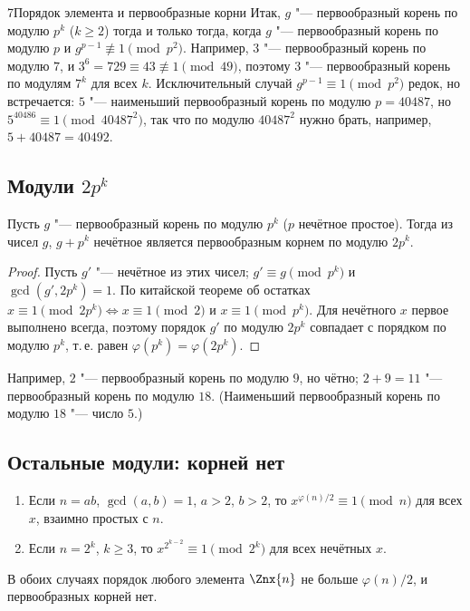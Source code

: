 \begin{lecture}{7}{Порядок элемента и первообразные корни}
Итак, $g$ "--- первообразный корень по модулю $p^k$ ($k \ge 2$) тогда и только тогда, когда
$g$ "--- первообразный корень по модулю $p$ и $g^{p-1} \not\equiv 1 \pmod{p^2}$. Например,
$3$ "--- первообразный корень по модулю $7$, и $3^6 = 729 \equiv 43 \not\equiv 1 \pmod{49}$,
поэтому $3$ "--- первообразный корень по модулям $7^k$ для всех $k$. Исключительный случай
$g^{p-1} \equiv 1 \pmod{p^2}$ редок, но встречается: $5$ "--- наименьший первообразный корень
по модулю $p = 40487$, но $5^{40486} \equiv 1 \pmod{40487^2}$, так что по модулю $40487^2$
нужно брать, например, $5 + 40487 = 40492$.

\subsection{Модули \texorpdfstring{$2p^k$}{2p\^{}k}}

\begin{proposition}\label{l7:2pk}
Пусть $g$ "--- первообразный корень по модулю $p^k$ ($p$ нечётное простое). Тогда из чисел
$g$, $g + p^k$ нечётное является первообразным корнем по модулю $2p^k$.
\end{proposition}

\begin{proof}
Пусть $g'$ "--- нечётное из этих чисел; $g' \equiv g \pmod{p^k}$ и $\gcd(g', 2p^k) = 1$. По
китайской теореме об остатках $x \equiv 1 \pmod{2p^k} \iff x \equiv 1 \pmod 2$ и
$x \equiv 1 \pmod{p^k}$. Для нечётного $x$ первое выполнено всегда, поэтому порядок $g'$ по
модулю $2p^k$ совпадает с порядком по модулю $p^k$, т.\,е. равен
$\varphi(p^k) = \varphi(2p^k)$.
\end{proof}

Например, $2$ "--- первообразный корень по модулю $9$, но чётно; $2 + 9 = 11$ "---
первообразный корень по модулю $18$. (Наименьший первообразный корень по модулю $18$ "---
число $5$.)

\subsection{Остальные модули: корней нет}

\begin{lemma}\label{l7:no-roots}
\begin{enumerate}
  \item Если $n = ab$, $\gcd(a, b) = 1$, $a > 2$, $b > 2$, то $x^{\varphi(n)/2} \equiv 1
    \pmod n$ для всех $x$, взаимно простых с $n$.
  \item Если $n = 2^k$, $k \ge 3$, то $x^{2^{k-2}} \equiv 1 \pmod{2^k}$ для всех нечётных $x$.
\end{enumerate}
В обоих случаях порядок любого элемента $\Znx{n}$ не больше $\varphi(n)/2$, и первообразных
корней нет.
\end{lemma}


\end{lecture}
